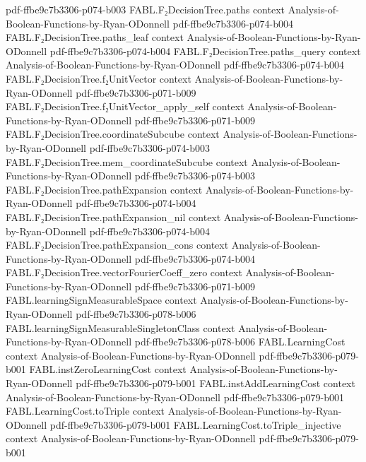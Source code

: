 \begin{theorem}
  {pdf-ffbe9c7b3306-p074-b003}
\proofstep
  {FABL.F₂DecisionTree.paths}
  {context}
  {Analysis-of-Boolean-Functions-by-Ryan-ODonnell}
  {pdf-ffbe9c7b3306-p074-b004}
\proofstep
  {FABL.F₂DecisionTree.paths_leaf}
  {context}
  {Analysis-of-Boolean-Functions-by-Ryan-ODonnell}
  {pdf-ffbe9c7b3306-p074-b004}
\proofstep
  {FABL.F₂DecisionTree.paths_query}
  {context}
  {Analysis-of-Boolean-Functions-by-Ryan-ODonnell}
  {pdf-ffbe9c7b3306-p074-b004}
\proofstep
  {FABL.F₂DecisionTree.f₂UnitVector}
  {context}
  {Analysis-of-Boolean-Functions-by-Ryan-ODonnell}
  {pdf-ffbe9c7b3306-p071-b009}
\proofstep
  {FABL.F₂DecisionTree.f₂UnitVector_apply_self}
  {context}
  {Analysis-of-Boolean-Functions-by-Ryan-ODonnell}
  {pdf-ffbe9c7b3306-p071-b009}
\proofstep
  {FABL.F₂DecisionTree.coordinateSubcube}
  {context}
  {Analysis-of-Boolean-Functions-by-Ryan-ODonnell}
  {pdf-ffbe9c7b3306-p074-b003}
\proofstep
  {FABL.F₂DecisionTree.mem_coordinateSubcube}
  {context}
  {Analysis-of-Boolean-Functions-by-Ryan-ODonnell}
  {pdf-ffbe9c7b3306-p074-b003}
\proofstep
  {FABL.F₂DecisionTree.pathExpansion}
  {context}
  {Analysis-of-Boolean-Functions-by-Ryan-ODonnell}
  {pdf-ffbe9c7b3306-p074-b004}
\proofstep
  {FABL.F₂DecisionTree.pathExpansion_nil}
  {context}
  {Analysis-of-Boolean-Functions-by-Ryan-ODonnell}
  {pdf-ffbe9c7b3306-p074-b004}
\proofstep
  {FABL.F₂DecisionTree.pathExpansion_cons}
  {context}
  {Analysis-of-Boolean-Functions-by-Ryan-ODonnell}
  {pdf-ffbe9c7b3306-p074-b004}
\proofstep
  {FABL.F₂DecisionTree.vectorFourierCoeff_zero}
  {context}
  {Analysis-of-Boolean-Functions-by-Ryan-ODonnell}
  {pdf-ffbe9c7b3306-p071-b009}
\proofstep
  {FABL.learningSignMeasurableSpace}
  {context}
  {Analysis-of-Boolean-Functions-by-Ryan-ODonnell}
  {pdf-ffbe9c7b3306-p078-b006}
\proofstep
  {FABL.learningSignMeasurableSingletonClass}
  {context}
  {Analysis-of-Boolean-Functions-by-Ryan-ODonnell}
  {pdf-ffbe9c7b3306-p078-b006}
\proofstep
  {FABL.LearningCost}
  {context}
  {Analysis-of-Boolean-Functions-by-Ryan-ODonnell}
  {pdf-ffbe9c7b3306-p079-b001}
\proofstep
  {FABL.instZeroLearningCost}
  {context}
  {Analysis-of-Boolean-Functions-by-Ryan-ODonnell}
  {pdf-ffbe9c7b3306-p079-b001}
\proofstep
  {FABL.instAddLearningCost}
  {context}
  {Analysis-of-Boolean-Functions-by-Ryan-ODonnell}
  {pdf-ffbe9c7b3306-p079-b001}
\proofstep
  {FABL.LearningCost.toTriple}
  {context}
  {Analysis-of-Boolean-Functions-by-Ryan-ODonnell}
  {pdf-ffbe9c7b3306-p079-b001}
\proofstep
  {FABL.LearningCost.toTriple_injective}
  {context}
  {Analysis-of-Boolean-Functions-by-Ryan-ODonnell}
  {pdf-ffbe9c7b3306-p079-b001}

\end{theorem}
